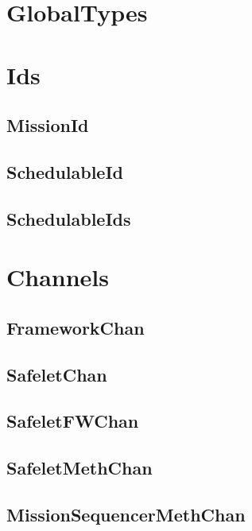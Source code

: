 \documentclass{article}
\begin{document}
\begin{plumbing}
\section{GlobalTypes}


\section{Ids}
\subsection{MissionId}


\subsection{SchedulableId}

\newpage
\subsection{SchedulableIds}

\newpage

\section{Channels}
\subsection{FrameworkChan}


\subsection{SafeletChan}


\subsection{SafeletFWChan}


\subsection{SafeletMethChan}


\subsection{MissionSequencerMethChan}



\end{plumbing}
\end{document}
